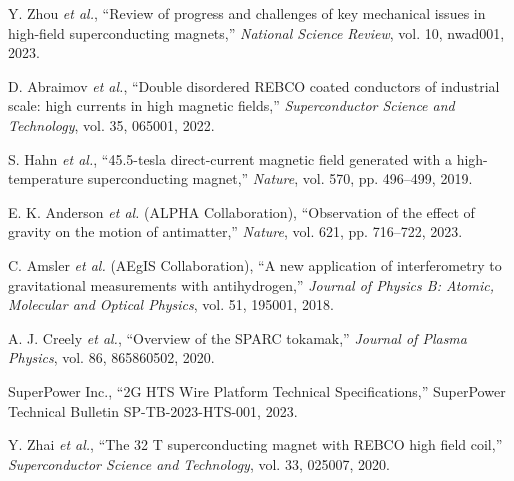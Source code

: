 \documentclass[10pt,twocolumn]{article}
\begin{document}
\begin{thebibliography}{8}

Y. Zhou \emph{et al.}, ``Review of progress and challenges of key mechanical issues in high-field superconducting magnets,'' \textit{National Science Review}, vol. 10, nwad001, 2023.

D. Abraimov \emph{et al.}, ``Double disordered REBCO coated conductors of industrial scale: high currents in high magnetic fields,'' \textit{Superconductor Science and Technology}, vol. 35, 065001, 2022.

S. Hahn \emph{et al.}, ``45.5-tesla direct-current magnetic field generated with a high-temperature superconducting magnet,'' \textit{Nature}, vol. 570, pp. 496--499, 2019.

E. K. Anderson \emph{et al.} (ALPHA Collaboration), ``Observation of the effect of gravity on the motion of antimatter,'' \textit{Nature}, vol. 621, pp. 716--722, 2023.

C. Amsler \emph{et al.} (AEgIS Collaboration), ``A new application of interferometry to gravitational measurements with antihydrogen,'' \textit{Journal of Physics B: Atomic, Molecular and Optical Physics}, vol. 51, 195001, 2018.

A. J. Creely \emph{et al.}, ``Overview of the SPARC tokamak,'' \textit{Journal of Plasma Physics}, vol. 86, 865860502, 2020.

SuperPower Inc., ``2G HTS Wire Platform Technical Specifications,'' SuperPower Technical Bulletin SP-TB-2023-HTS-001, 2023.

Y. Zhai \emph{et al.}, ``The 32 T superconducting magnet with REBCO high field coil,'' \textit{Superconductor Science and Technology}, vol. 33, 025007, 2020.

\end{thebibliography}
\end{document}
